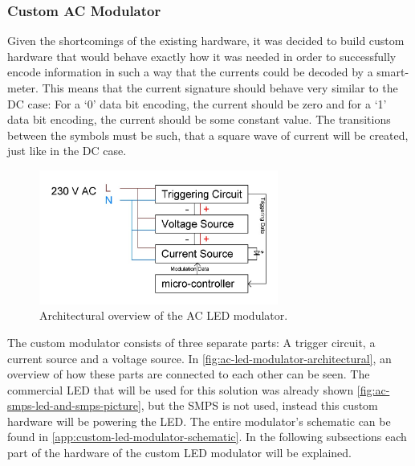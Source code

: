 
\subsubsection{Custom AC Modulator}






Given the shortcomings of the existing hardware, it was decided to build custom hardware that would behave exactly how it was needed in order to successfully encode information in such a way that the currents could be decoded by a smart-meter.
This means that the current signature should behave very similar to the DC case: For a `0' data bit encoding, the current should be zero and for a `1' data bit encoding, the current should be some constant value.
The transitions between the symbols must be such, that a square wave of current will be created, just like in the DC case. 

\begin{figure}[h]
	\centering
	\includegraphics[angle=0,width=0.7\textwidth]{chapters/hardware-chapters/AC/ac-modulator/custom-hardware/ac-modulator-architectural.JPG}
	\caption{Architectural overview of the AC LED modulator.}
	\label{fig:ac-led-modulator-architectural}
\end{figure}

The custom modulator consists of three separate parts: A trigger circuit, a current source and a voltage source.
In \autoref{fig:ac-led-modulator-architectural}, an overview of how these parts are connected to each other can be seen.
The commercial LED that will be used for this solution was already shown \autoref{fig:ac-smps-led-and-smps-picture}, but the SMPS is not used, instead this custom hardware will be powering the LED. 
The entire modulator's schematic can be found in \autoref{app:custom-led-modulator-schematic}.
In the following subsections each part of the hardware of the custom LED modulator will be explained.









